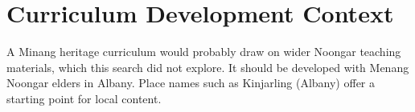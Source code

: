 \documentclass[12pt]{article}
\begin{document}
\section{Curriculum Development Context}
A Minang heritage curriculum would probably draw on wider Noongar teaching materials, which this search did not explore. It should be developed with Menang Noongar elders in Albany. Place names such as Kinjarling (Albany) offer a starting point for local content.
\end{document}
